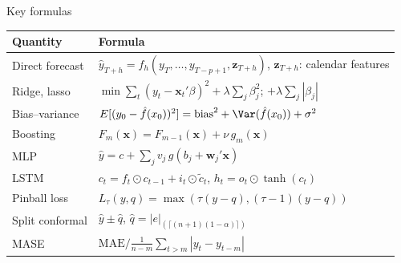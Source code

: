 \begin{frame}{Key formulas}
\itemsize{\small}
{\renewcommand{\arraystretch}{1.35}\begin{center}
\footnotesize
\begin{tabular}{ll}
\toprule
\textbf{Quantity} & \textbf{Formula} \\
\midrule
Direct forecast & $\hat y_{T+h} = \hat f_h(y_T, \dots, y_{T-p+1}, \mathbf{z}_{T+h})$, $\mathbf{z}_{T+h}$: calendar features \\
Ridge, lasso & $\min \sum_t (y_t - \mathbf{x}_t'\beta)^2 + \lambda\sum_j\beta_j^2$; \quad $+ \lambda\sum_j|\beta_j|$ \\
Bias--variance & $E[(y_0 - \hat f(x_0))^2] = \text{bias}^2 + \Var(\hat f(x_0)) + \sigma^2$ \\
Boosting & $F_m(\mathbf{x}) = F_{m-1}(\mathbf{x}) + \nu\,g_m(\mathbf{x})$ \\
MLP & $\hat y = c + \sum_j v_j\,g(b_j + \mathbf{w}_j'\mathbf{x})$ \\
LSTM & $c_t = f_t \odot c_{t-1} + i_t \odot \tilde c_t$, \quad $h_t = o_t \odot \tanh(c_t)$ \\
Pinball loss & $L_\tau(y, q) = \max(\tau(y - q), (\tau - 1)(y - q))$ \\
Split conformal & $\hat y \pm \hat q$, \quad $\hat q = |e|_{(\lceil (n+1)(1-\alpha) \rceil)}$ \\
MASE & $\text{MAE} / \frac{1}{n-m}\sum_{t>m}|y_t - y_{t-m}|$ \\
\bottomrule
\end{tabular}
\end{center}
}
\end{frame}

